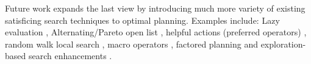 Future work expands the last view by introducing much more variety of
existing satisficing search techniques to optimal planning. Examples
include: Lazy evaluation \cite{richter2010lama}, Alternating/Pareto open
list \cite{RogerH10}, helpful actions (preferred operators) \cite{Hoffmann01},
random walk local search \cite{nakhost2009monte}, macro operators
\cite{Botea2005,ChrpaVM15}, factored planning
\cite{amir2003factored,brafman2006factored,Asai2015} and
exploration-based search enhancements
\cite{valenzano2014comparison,xie14type,Valenzano2016}.
